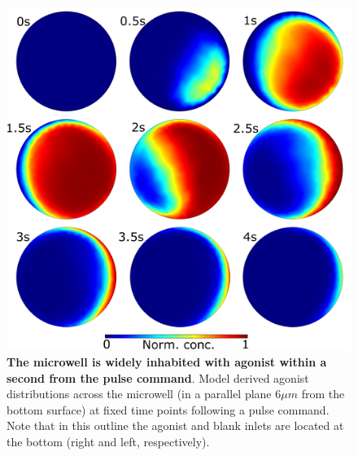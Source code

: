   \begin{figure}[!htb]
       \centering
       \includegraphics[width=15cm]{chapter6/figures/concentrationsChart/concentrationsChart.jpg}
       \caption[Spatial distributions of agonist concentration in the microwell during a pulse]{\textbf{The microwell is widely inhabited with agonist within a second from the pulse command}. Model derived agonist distributions across the microwell (in a parallel plane \(6 \mu m\) from the bottom surface) at fixed time points following a pulse command. Note that in this outline the agonist and blank inlets are located at the bottom (right and left, respectively).}
       \label{fig:pulses:concentrationsChart}
  \end{figure}

